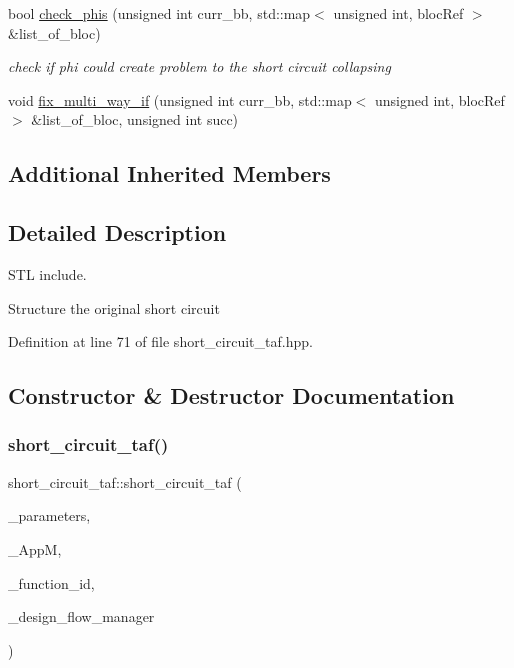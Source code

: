 \begin{DoxyCompactItemize}
bool \hyperlink{classshort__circuit__taf_ae6d5913aa8df5e681f440a8ed11981a2}{check\+\_\+phis} (unsigned int curr\+\_\+bb, std\+::map$<$ unsigned int, bloc\+Ref $>$ \&list\+\_\+of\+\_\+bloc)
\begin{DoxyCompactList}\small\item\em check if phi could create problem to the short circuit collapsing \end{DoxyCompactList}\item 
void \hyperlink{classshort__circuit__taf_a295d6fe0b5076cb8c4b21b0de330677b}{fix\+\_\+multi\+\_\+way\+\_\+if} (unsigned int curr\+\_\+bb, std\+::map$<$ unsigned int, bloc\+Ref $>$ \&list\+\_\+of\+\_\+bloc, unsigned int succ)
\end{DoxyCompactItemize}
\subsection*{Additional Inherited Members}


\subsection{Detailed Description}
S\+TL include. 

Structure the original short circuit 

Definition at line 71 of file short\+\_\+circuit\+\_\+taf.\+hpp.



\subsection{Constructor \& Destructor Documentation}
\mbox{\label{classshort__circuit__taf_a45779c36d6745e44e9463694cf4536cc}} 
\subsubsection{\texorpdfstring{short\+\_\+circuit\+\_\+taf()}{short\_circuit\_taf()}}
{\footnotesize\ttfamily short\+\_\+circuit\+\_\+taf\+::short\+\_\+circuit\+\_\+taf (\begin{DoxyParamCaption}\item[{const \hyperlink{Parameter_8hpp_a37841774a6fcb479b597fdf8955eb4ea}{Parameter\+Const\+Ref}}]{\+\_\+parameters,  }\item[{const \hyperlink{application__manager_8hpp_a04ccad4e5ee401e8934306672082c180}{application\+\_\+manager\+Ref}}]{\+\_\+\+AppM,  }\item[{unsigned int}]{\+\_\+function\+\_\+id,  }\item[{const Design\+Flow\+Manager\+Const\+Ref}]{\+\_\+design\+\_\+flow\+\_\+manager }\end{DoxyParamCaption})}



